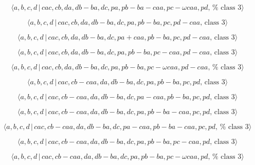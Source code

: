 \documentclass[10pt]{article}
\begin{document}
\begin{equation}
\langle a,b,c,d\,|\,cac,cb,da,db-ba,dc,pa,pb-ba-caa,pc-\omega caa,pd,\,\text{%
class }3\rangle  \tag{7.4186}
\end{equation}

\begin{equation}
\langle a,b,c,d\,|\,cac,cb,da,db-ba,dc,pa,pb-ba,pc,pd-caa,\,\text{class }%
3\rangle  \tag{7.4187}
\end{equation}

\begin{equation}
\langle a,b,c,d\,|\,cac,cb,da,db-ba,dc,pa+caa,pb-ba,pc,pd-caa,\,\text{class }%
3\rangle  \tag{7.4188}
\end{equation}

\begin{equation}
\langle a,b,c,d\,|\,cac,cb,da,db-ba,dc,pa,pb-ba,pc-caa,pd-caa,\,\text{class }%
3\rangle  \tag{7.4189}
\end{equation}

\begin{equation}
\langle a,b,c,d\,|\,cac,cb,da,db-ba,dc,pa,pb-ba,pc-\omega caa,pd-caa,\,\text{%
class }3\rangle  \tag{7.4190}
\end{equation}

\begin{equation}
\langle a,b,c,d\,|\,cac,cb-caa,da,db-ba,dc,pa,pb-ba,pc,pd,\,\text{class }%
3\rangle  \tag{7.4191}
\end{equation}

\begin{equation}
\langle a,b,c,d\,|\,cac,cb-caa,da,db-ba,dc,pa-caa,pb-ba,pc,pd,\,\text{class }%
3\rangle  \tag{7.4192}
\end{equation}

\begin{equation}
\langle a,b,c,d\,|\,cac,cb-caa,da,db-ba,dc,pa,pb-ba-caa,pc,pd,\,\text{class }%
3\rangle  \tag{7.4193}
\end{equation}

\begin{equation}
\langle a,b,c,d\,|\,cac,cb-caa,da,db-ba,dc,pa-caa,pb-ba-caa,pc,pd,\,\text{%
class }3\rangle  \tag{7.4194}
\end{equation}

\begin{equation}
\langle a,b,c,d\,|\,cac,cb-caa,da,db-ba,dc,pa,pb-ba,pc-caa,pd,\,\text{class }%
3\rangle  \tag{7.4195}
\end{equation}

\begin{equation}
\langle a,b,c,d\,|\,cac,cb-caa,da,db-ba,dc,pa,pb-ba,pc-\omega caa,pd,\,\text{%
class }3\rangle  \tag{7.4196}
\end{equation}
\end{document}
